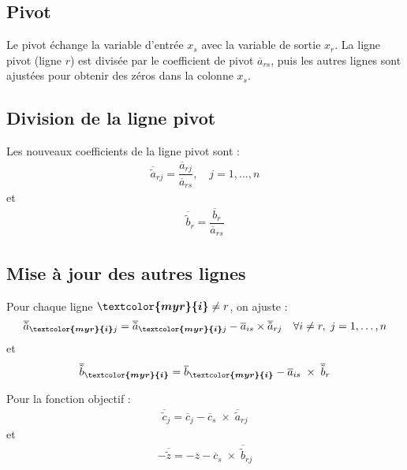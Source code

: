 \documentclass{report}
\begin{document}
\begin{multicols*}{2}
\section{Pivot}

Le pivot échange la variable d'entrée $x_s$ avec la variable de sortie $x_r$. La ligne pivot
(ligne $r$) est divisée par le coefficient de pivot $\overline{a}_{rs}$, puis les autres
lignes sont ajustées pour obtenir des zéros dans la colonne $x_s$.

\subsection{Division de la ligne pivot}

Les nouveaux coefficients de la ligne pivot sont :
\begin{align*}
    \overline{\tilde{a}}_{rj} = \dfrac{\overline{a}_{rj}}{\overline{a}_{rs}},\quad
    j = 1, \dots, n
\end{align*}
et
\begin{align*}
    \overline{\tilde{b}}_r = \dfrac{\overline{b}_r}{\overline{a}_{rs}}
\end{align*}

\subsection{Mise à jour des autres lignes}

Pour chaque ligne $\boldsymbol{\textcolor{myr}{i}} \neq r$, on ajuste :
\begin{align*}
    \overline{\tilde{a}}_{\boldsymbol{\textcolor{myr}{i} }j} = 
    \overline{\tilde{a}}_{\boldsymbol{\textcolor{myr}{i} }j} -  
    \overline{a}_{is} \times \overline{\tilde{a}}_{rj} \quad
    \forall i \neq r, \; j = 1, \dots, n
\end{align*}
et
\begin{align*}
    \overline{\tilde{b}}_{\boldsymbol{\textcolor{myr}{i} }} = 
    \overline{b}_{\boldsymbol{\textcolor{myr}{i} }} 
    - \overline{a}_{is} \; \times \;  \overline{\tilde{b}}_r
\end{align*}

Pour la fonction objectif :
\begin{align*}
    \overline{\tilde{c}}_{j} = 
    \overline{c}_{j} 
    - \overline{c}_{s} \; \times \; \overline{\tilde{a}}_{rj} 
\end{align*}
et
\begin{align*}
    -\overline{\tilde{z}} = -\overline{z} - \overline{c}_s  \; \times \;
    \overline{\tilde{b}}_{rj}
\end{align*}


\end{multicols*}
\end{document}
